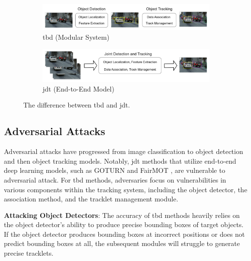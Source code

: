 \begin{figure}[H]
    \centering
    \begin{subfigure}[b]{\textwidth}
        \centering
        \includegraphics[width=\linewidth]{figures/chapter_tracking/tbd.jpg}
        \caption{\acrlong{tbd} (Modular System)}
        \label{fig:tbd} 
    \end{subfigure}
    \begin{subfigure}[b]{\textwidth}
        \centering
        \includegraphics[width=\linewidth]{figures/chapter_tracking/jdt.jpg}
        \caption{\acrlong{jdt} (End-to-End Model)}
        \label{fig:jdt}
    \end{subfigure}
  \caption{The difference between \acrfull{tbd} and \acrfull{jdt}.}
  \label{fig:tracking_framework}
\end{figure}


\subsection{Adversarial Attacks}

Adversarial attacks have progressed from image classification to object detection and then object tracking models. Notably, \acrfull{jdt} methods that utilize end-to-end deep learning models, such as GOTURN \citep{wiyatno2019physical} and FairMOT \citep{lin2021trasw}, are vulnerable to adversarial attack. For \acrfull{tbd} methods, adversaries focus on vulnerabilities in various components within the tracking system, including the object detector, the association method, and the tracklet management module.

\textbf{Attacking Object Detectors}: The accuracy of \acrshort{tbd} methods heavily relies on the object detector's ability to produce precise bounding boxes of target objects. If the object detector produces bounding boxes at incorrect positions or does not predict bounding boxes at all, the subsequent modules will struggle to generate precise tracklets. 

